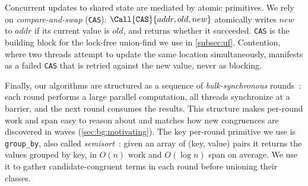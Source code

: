 
Concurrent updates to shared state are mediated by atomic primitives. We rely on
\emph{compare-and-swap} (\texttt{CAS}): $\Call{\texttt{CAS}}{addr, old, new}$ atomically
writes $new$ to $addr$ if its current value is $old$, and returns whether it
succeeded. \texttt{CAS} is the building block for the lock-free union-find we
use in \autoref{subsec:uf}. Contention, where two threads attempt to update the same location
simultaneously, manifests as a failed \texttt{CAS} that is retried against
the new value, never as blocking.

Finally, our algorithms are structured as a sequence of \emph{bulk-synchronous}
rounds~\cite{valiant-bsp}: each round performs a large parallel computation, all
threads synchronize at a barrier, and the next round consumes the results. This
structure makes per-round work and span easy to reason about and matches how new
congruences are discovered in waves (\autoref{sec:bg:motivating}). The key
per-round primitive we use is \texttt{group\_by}, also called
\emph{semisort}~\cite{semisort}: given an array of (key, value) pairs it returns
the values grouped by key, in $O(n)$ work and $O(\log n)$ span on average. We
use it to gather candidate-congruent terms in each round before unioning their
classes.





